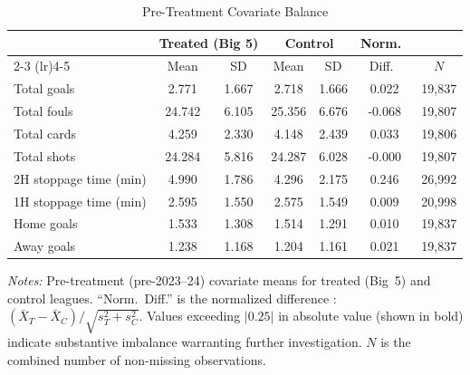 \begin{table}[htbp]
\centering
\begin{threeparttable}
\caption{Pre-Treatment Covariate Balance}
\label{tab:balance}
\begin{tabular}{lcccccc}
\toprule
& \multicolumn{2}{c}{Treated (Big 5)} & \multicolumn{2}{c}{Control} & Norm.\ & \\
\cmidrule(lr){2-3} \cmidrule(lr){4-5}
& Mean & SD & Mean & SD & Diff.\ & $N$ \\
\midrule
\quad Total goals & 2.771 & 1.667 & 2.718 & 1.666 & 0.022 & 19,837 \\
\quad Total fouls & 24.742 & 6.105 & 25.356 & 6.676 & -0.068 & 19,807 \\
\quad Total cards & 4.259 & 2.330 & 4.148 & 2.439 & 0.033 & 19,806 \\
\quad Total shots & 24.284 & 5.816 & 24.287 & 6.028 & -0.000 & 19,807 \\
\quad 2H stoppage time (min) & 4.990 & 1.786 & 4.296 & 2.175 & 0.246 & 26,992 \\
\quad 1H stoppage time (min) & 2.595 & 1.550 & 2.575 & 1.549 & 0.009 & 20,998 \\
\quad Home goals & 1.533 & 1.308 & 1.514 & 1.291 & 0.010 & 19,837 \\
\quad Away goals & 1.238 & 1.168 & 1.204 & 1.161 & 0.021 & 19,837 \\
\bottomrule
\end{tabular}
\begin{tablenotes}[flushleft]
\footnotesize
\item \textit{Notes:} Pre-treatment (pre-2023--24) covariate means for treated (Big~5)
and control leagues. ``Norm.\ Diff.'' is the normalized difference
\citep{imbens2009recent}: $(\bar{X}_T - \bar{X}_C)/\sqrt{s_T^2 + s_C^2}$.
Values exceeding $|0.25|$ in absolute value (shown in bold) indicate substantive
imbalance warranting further investigation. $N$ is the combined number of
non-missing observations.
\end{tablenotes}
\end{threeparttable}
\end{table}
